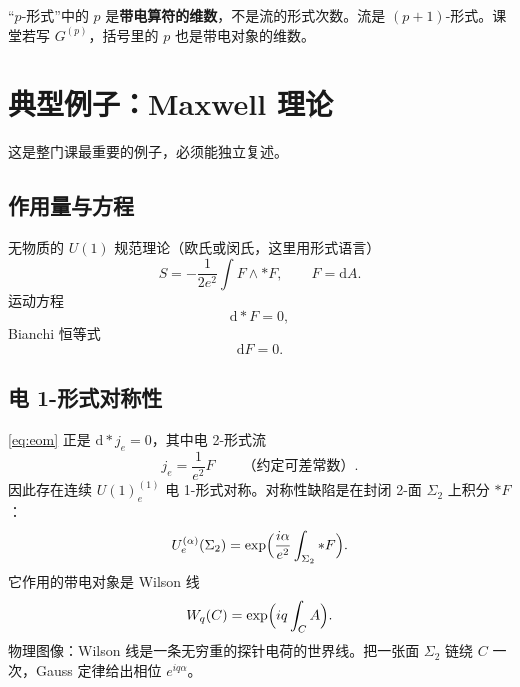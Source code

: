 \documentclass[11pt,a4paper]{article}
\theoremstyle{definition}
\theoremstyle{plain}
\theoremstyle{remark}
\newcommand{\dd}{\mathrm{d}}
\begin{document}
\begin{warnbox}
``$p$-形式''中的 $p$ 是\textbf{带电算符的维数}，不是流的形式次数。流是 $(p+1)$-形式。课堂若写 $G^{(p)}$，括号里的 $p$ 也是带电对象的维数。
\end{warnbox}

\section{典型例子：Maxwell 理论}
\label{sec:maxwell}

这是整门课最重要的例子，必须能独立复述。

\subsection{作用量与方程}

无物质的 $U(1)$ 规范理论（欧氏或闵氏，这里用形式语言）
\begin{equation}
  S=-\frac{1}{2e^2}\int F\wedge{*}F,\qquad F=\dd A.
\end{equation}
运动方程
\begin{equation}
\label{eq:eom}
  \dd{*}F=0,
\end{equation}
Bianchi 恒等式
\begin{equation}
\label{eq:bianchi}
  \dd F=0.
\end{equation}

\subsection{电 1-形式对称性}

\eqref{eq:eom} 正是 $\dd{*}j_e=0$，其中电 2-形式流
\begin{equation}
  j_e=\frac{1}{e^2}F\qquad\text{（约定可差常数）}.
\end{equation}
因此存在连续 $U(1)^{(1)}_e$ 电 1-形式对称。对称性缺陷是在封闭 2-面 $\Sigma_2$ 上积分 $*F$：
\begin{equation}
  U_e^{(\alpha)}(\Sigma_2)=\exp\Bigl(\frac{i\alpha}{e^2}\int_{\Sigma_2}{*F}\Bigr).
\end{equation}
它作用的带电对象是 Wilson 线
\begin{equation}
  W_q(C)=\exp\Bigl(iq\int_C A\Bigr).
\end{equation}
物理图像：Wilson 线是一条无穷重的探针电荷的世界线。把一张面 $\Sigma_2$ 链绕 $C$ 一次，Gauss 定律给出相位 $e^{iq\alpha}$。
\end{document}
